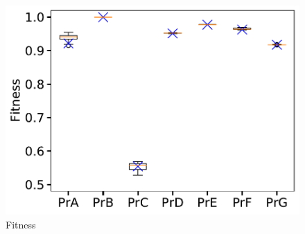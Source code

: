 \documentclass[landscape]{article}
\begin{document}
\begin{figure}[!htb]
\begin{minipage}{0.32\textwidth}
			\includegraphics[width=1.0\textwidth]{../benchmark_fitness.pdf}
			\caption{Fitness}
		\end{minipage}		
	\end{figure}
	\newpage
	
\end{document}
